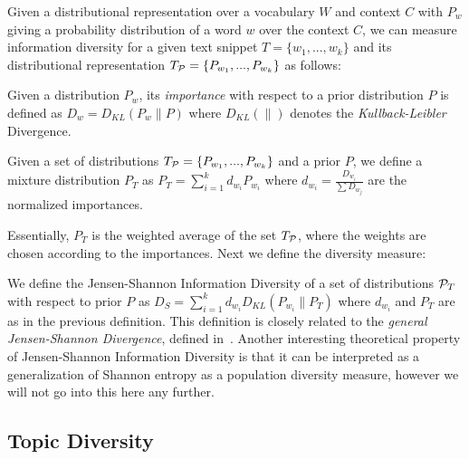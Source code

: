 \documentclass{article} %
\begin{document}
Given a distributional representation over a vocabulary $W$ and context $C$ with $P_w$ giving a probability distribution of a
word $w$ over the context $C$, we can measure information diversity for a given text snippet $T=\{w_1,...,w_k\}$ and its
distributional representation $T_{{\mathcal P}}=\{P_{w_1},...,P_{w_k}\}$ as follows:

\bed\label{importance}
Given a distribution $P_w$, its {\sl importance} with respect to a
prior distribution $P$ is defined as $D_w = D_{KL}(P_w\|P)$ where $D_{KL}(\|)$ denotes the
{\sl Kullback-Leibler} Divergence.
\eed

\bed\label{mixture}
Given a set of distributions $T_{{\mathcal P}}=\{P_{w_1},...,P_{w_k}\}$ and a
prior $P$, we
define a mixture distribution $P_T$ as $P_T=\sum_{i=1}^k d_{w_i} P_{w_i}$ where $d_{w_i}=\frac{D_{w_i}}{\sum D_{w_j}}$ are the normalized
importances.
\eed

Essentially, $P_T$ is the weighted average of the set $T_{{\mathcal P}}$, where
the weights are chosen according to the importances. Next we
define the diversity measure:

\bed\label{diversity}
We define the Jensen-Shannon Information Diversity of a set of
distributions ${\mathcal P}_T$ with respect to 
prior $P$ as $D_S=\sum_{i=1}^k d_{w_i}D_{KL}(P_{w_i}\|P_T)$
where $d_{w_i}$ and $P_T$ are as in the previous definition.
\eed
This definition is closely related to the 
{\em general Jensen-Shannon Divergence}, defined in~\cite{FugledeTopsoe}. Another
interesting theoretical property of Jensen-Shannon Information
Diversity is that it can be interpreted as a generalization of Shannon
entropy as a population diversity measure, however we will not go
into this here any further. 


\subsection{Topic Diversity}
\label{sec:topic-diversity}
\end{document}
